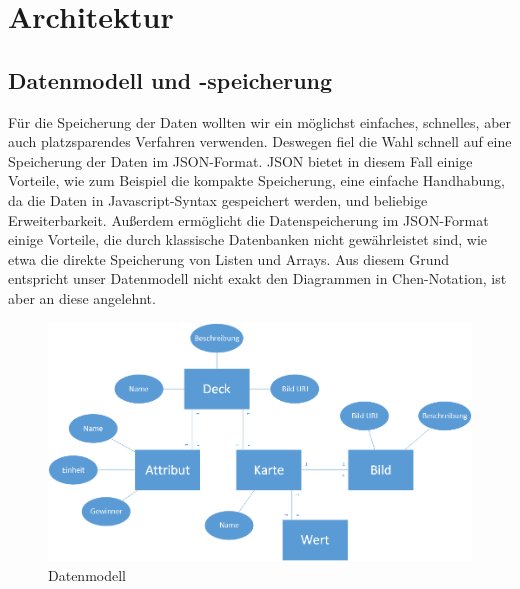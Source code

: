 \section{Architektur}
\label{sec:implementierung:architektur}

\subsection{Datenmodell und -speicherung}
\label{sec:implementierung:architektur:datenmodell }

Für die Speicherung der Daten wollten wir ein möglichst einfaches, schnelles, aber auch platzsparendes Verfahren verwenden. Deswegen fiel die Wahl schnell auf eine Speicherung der Daten im JSON-Format. JSON bietet in diesem Fall einige Vorteile, wie zum Beispiel die kompakte Speicherung, eine einfache Handhabung, da die Daten in Javascript-Syntax gespeichert werden, und beliebige Erweiterbarkeit. Außerdem ermöglicht die Datenspeicherung im JSON-Format einige Vorteile, die durch klassische Datenbanken nicht gewährleistet sind, wie etwa die direkte Speicherung von Listen und Arrays. Aus diesem Grund entspricht unser Datenmodell nicht exakt den Diagrammen in Chen-Notation, ist aber an diese angelehnt.\\

\begin{figure}[htp]
	\centering
  	\includegraphics[width=\textwidth]{img/modelle/Datenmodell_aktualisiert.png}
	\caption{Datenmodell}
	\label{figure:implementierungdatenmodell}
\end{figure}


